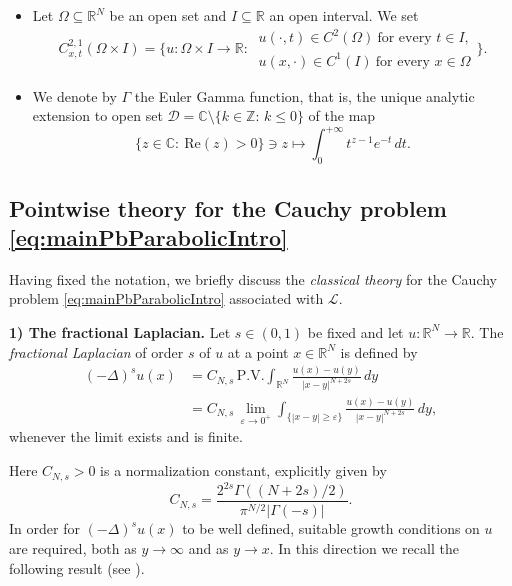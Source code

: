 \documentclass[11pt,a4paper,reqno]{amsart}
\def \R {\mathbb{R}}
\theoremstyle{definition}
\theoremstyle{plain}
\numberwithin{equation}{section}
\begin{document}
\begin{itemize}
 \item Let $\Omega\subseteq\mathbb{R}^N$ be an open set and $I\subseteq\mathbb{R}$ an open interval. We set
 \begin{equation} \label{eq:C21xtDef}
 C^{2,1}_{x,t}(\Omega\times I) = \Big\{u:\Omega\times I\to\mathbb{R}:\
 \begin{array}{l}
 u(\cdot,t)\in C^2(\Omega)\ \text{for every } t\in I,\\
 u(x,\cdot)\in C^1(I)\ \text{for every } x\in\Omega
 \end{array}
 \Big\}.
 \end{equation}

 \item We denote by $\Gamma$ the Euler Gamma function, that is, the unique analytic extension to open set $\mathcal{D} = \mathbb{C}\setminus\{k\in\mathbb{Z}:\,k\leq 0\}$ of the map
 $$\{z\in\mathbb{C}:\ \mathrm{Re}(z)>0\}\ni z \mapsto \int_0^{+\infty}t^{z-1}e^{-t}\,dt.$$
\end{itemize}

\subsection{Pointwise theory for the Cauchy problem \eqref{eq:mainPbParabolicIntro}}
Having fixed the notation, we briefly discuss the \emph{classical theory} for the Cauchy problem \eqref{eq:mainPbParabolicIntro} associated with $\mathcal{L}$.
\medskip

\noindent\textbf{1) The fractional Laplacian.}
Let $s\in (0,1)$ be fixed and let $u:\R^N\to\R$. The \emph{fractional Laplacian} of order $s$ of $u$ at a point $x\in\R^N$ is defined by
\begin{equation} \label{eq:defDeltas}
\begin{split}
 (-\Delta)^s u(x) & = C_{N,s}\,\mathrm{P.V.}\int_{\R^N}\frac{u(x)-u(y)}{|x-y|^{N+2s}}\,dy \\
& = C_{N,s}\,\lim_{\varepsilon\to 0^+}\int_{\{|x-y|\geq\varepsilon\}}\frac{u(x)-u(y)}{|x-y|^{N+2s}}\,dy,
\end{split}
\end{equation}
whenever the limit exists and is finite.

Here $C_{N,s} > 0$ is a normalization constant, explicitly given by
$$C_{N,s} = \frac{2^{2s}\Gamma((N+2s)/2)}{\pi^{N/2}|\Gamma(-s)|}.$$
In order for $(-\Delta)^s u(x)$ to be well defined, suitable growth conditions on $u$ are required, both as $y\to\infty$ and as $y\to x$. In this direction we recall the following result (see \cite{KKP,Silv0}).
\end{document}
